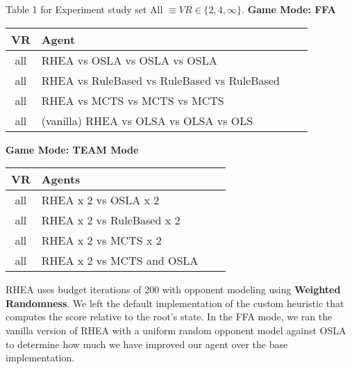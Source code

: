 \documentclass{report}
\begin{document}
Table 1 for Experiment study set All $\equiv VR \in \{2, 4, \infty\}$. \textbf{Game Mode: FFA}
\newline
\begin{center}
	\begin{tabularx}{300pt}{|c|X|c|X|}
	\hline
	VR & Agent \\
	\hline
	all  & RHEA vs OSLA vs OSLA vs OSLA \\
	\hline
	all & RHEA vs RuleBased vs RuleBased vs RuleBased\\
	\hline
	all & RHEA vs MCTS vs MCTS vs MCTS\\
	\hline
	all & (vanilla) RHEA vs OLSA vs OLSA vs OLS\\
	\hline
\end{tabularx}
\newline
\newline
\newline
\newline
\newline
\newline
\textbf{Game Mode: TEAM Mode}
\newline
\newline
\begin{tabularx}{300pt}{|c|X|c|X|}
	\hline
    VR & Agents  \\
    \hline
    all & RHEA x 2 vs OSLA x 2  \\
    \hline
     all & RHEA x 2 vs RuleBased x 2 \\ 
     \hline
     all & RHEA x 2 vs MCTS x 2\\ 
     \hline
     all & RHEA x 2 vs MCTS and OSLA \\
    \hline
\end{tabularx}
\end{center}


    RHEA uses budget iterations of 200 with opponent modeling using \textbf{ Weighted Randomness}. We left the default implementation of the custom heuristic that computes the score relative to the root's state.
    In the FFA mode, we ran the vanilla version of RHEA with a uniform random opponent model against OSLA  to determine how much we have improved our agent over the base implementation.
\end{document}
